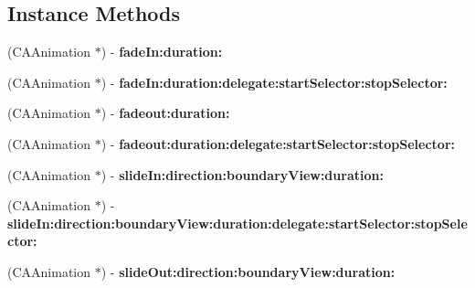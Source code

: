 \subsection*{Instance Methods}
\begin{DoxyCompactItemize}
\item 
\hypertarget{interface_t_x_s_animation_factory_a2d04be07ce0bf2062e9a54d4a41324f8}{}(C\+A\+Animation $\ast$) -\/ {\bfseries fade\+In\+:duration\+:}\label{interface_t_x_s_animation_factory_a2d04be07ce0bf2062e9a54d4a41324f8}

\item 
\hypertarget{interface_t_x_s_animation_factory_ad237cfdb2e2244d6a731946037a83cab}{}(C\+A\+Animation $\ast$) -\/ {\bfseries fade\+In\+:duration\+:delegate\+:start\+Selector\+:stop\+Selector\+:}\label{interface_t_x_s_animation_factory_ad237cfdb2e2244d6a731946037a83cab}

\item 
\hypertarget{interface_t_x_s_animation_factory_a8fbd60341c9cc3e9a8eb57bebd53add1}{}(C\+A\+Animation $\ast$) -\/ {\bfseries fadeout\+:duration\+:}\label{interface_t_x_s_animation_factory_a8fbd60341c9cc3e9a8eb57bebd53add1}

\item 
\hypertarget{interface_t_x_s_animation_factory_a9609b78162ccf9b9bc12a9f013a94061}{}(C\+A\+Animation $\ast$) -\/ {\bfseries fadeout\+:duration\+:delegate\+:start\+Selector\+:stop\+Selector\+:}\label{interface_t_x_s_animation_factory_a9609b78162ccf9b9bc12a9f013a94061}

\item 
\hypertarget{interface_t_x_s_animation_factory_a345e8ef9e507433a90413b350493ec49}{}(C\+A\+Animation $\ast$) -\/ {\bfseries slide\+In\+:direction\+:boundary\+View\+:duration\+:}\label{interface_t_x_s_animation_factory_a345e8ef9e507433a90413b350493ec49}

\item 
\hypertarget{interface_t_x_s_animation_factory_af0104a45bd3cb2893b437296847d6fb2}{}(C\+A\+Animation $\ast$) -\/ {\bfseries slide\+In\+:direction\+:boundary\+View\+:duration\+:delegate\+:start\+Selector\+:stop\+Selector\+:}\label{interface_t_x_s_animation_factory_af0104a45bd3cb2893b437296847d6fb2}

\item 
\hypertarget{interface_t_x_s_animation_factory_ac66b418b067dac485fcb83a0656a8e8e}{}(C\+A\+Animation $\ast$) -\/ {\bfseries slide\+Out\+:direction\+:boundary\+View\+:duration\+:}\label{interface_t_x_s_animation_factory_ac66b418b067dac485fcb83a0656a8e8e}


\end{DoxyCompactItemize}
